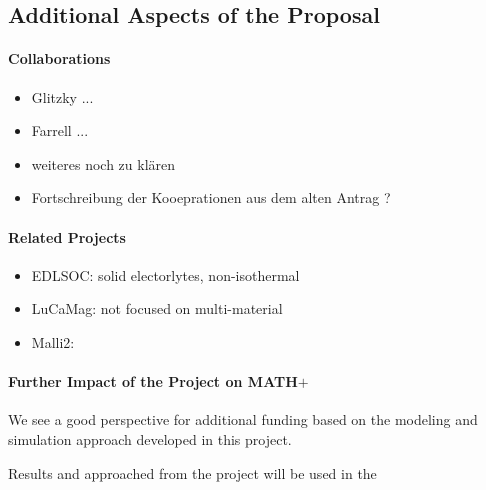 \documentclass[a4paper,10pt]{article}
\begin{document}
\subsection*{Additional Aspects of the Proposal}

\paragraph{Collaborations}
\begin{itemize}
\item Glitzky ...
\item Farrell ...
\item weiteres noch zu klären
\end{itemize}

\begin{itemize}
\item Fortschreibung der Kooeprationen aus dem alten Antrag ?
\end{itemize}

\paragraph{Related Projects}
\begin{itemize}
\item EDLSOC: solid electorlytes, non-isothermal
\item LuCaMag: not focused on multi-material
\item Malli2: 
\end{itemize}

\paragraph{Further Impact of the Project on MATH$+$}
We see a good perspective for additional funding based on the modeling and simulation approach
developed in this project.

Results and approached from the project will be used in the 
\end{document}
